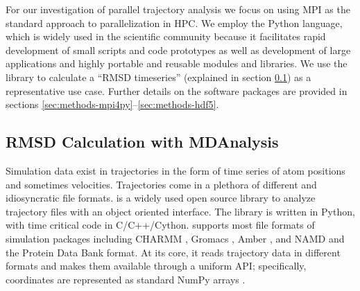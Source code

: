 \label{sec:packages}

For our investigation of parallel trajectory analysis we focus on using MPI as the standard approach to parallelization in HPC.
We employ the Python language, which is widely used in the scientific community because it facilitates rapid development of small scripts and code prototypes as well as development of large applications and highly portable and reusable modules and libraries.
We use the  library to calculate a ``RMSD timeseries'' (explained in section \ref{sec:mda}) as a representative use case.
Further details on the software packages are provided in sections \ref{sec:methods-mpi4py}--\ref{sec:methods-hdf5}.


\subsection{RMSD Calculation with MDAnalysis}
\label{sec:mda}

Simulation data exist in trajectories in the form of time series of atom positions and sometimes velocities.
Trajectories come in a plethora of different and idiosyncratic file formats. 
 \cite{Gowers:2016aa, Michaud-Agrawal:2011fu} is a widely used open source library to analyze trajectory files with an object oriented interface. 
The library is written in Python, with time critical code in C/C++/Cython. 
 supports most file formats of simulation packages including CHARMM \cite{Brooks:2009pt}, Gromacs \cite{Abraham:2015aa}, Amber \cite{Case:2005uq}, and NAMD \cite{Phillips:2005ek} and the Protein Data Bank \cite{Burley:2018aa} format.
At its core, it reads trajectory data in different formats and makes them available through a uniform API; specifically, coordinates are represented as standard NumPy arrays \cite{Van-Der-Walt:2011aa}.
 
